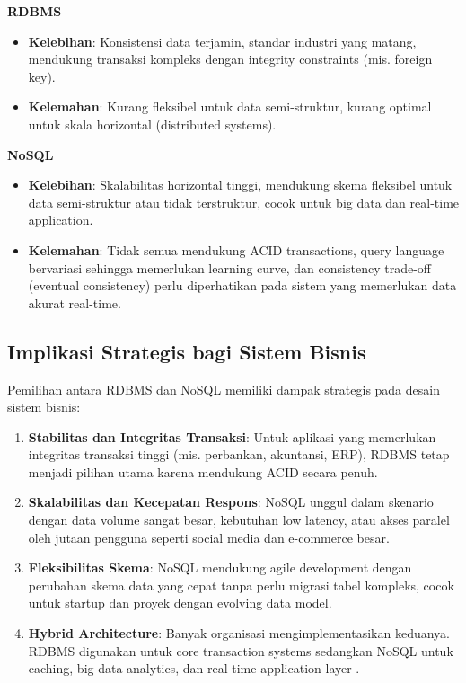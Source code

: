 \textbf{RDBMS}
\begin{itemize}
	\item \textbf{Kelebihan}: Konsistensi data terjamin, standar industri yang matang, mendukung transaksi kompleks dengan integrity constraints (mis. foreign key).
	\item \textbf{Kelemahan}: Kurang fleksibel untuk data semi-struktur, kurang optimal untuk skala horizontal (distributed systems).
\end{itemize}

\textbf{NoSQL}
\begin{itemize}
	\item \textbf{Kelebihan}: Skalabilitas horizontal tinggi, mendukung skema fleksibel untuk data semi-struktur atau tidak terstruktur, cocok untuk big data dan real-time application.
	\item \textbf{Kelemahan}: Tidak semua mendukung ACID transactions, query language bervariasi sehingga memerlukan learning curve, dan consistency trade-off (eventual consistency) perlu diperhatikan pada sistem yang memerlukan data akurat real-time.
\end{itemize}

\subsection{Implikasi Strategis bagi Sistem Bisnis}

Pemilihan antara RDBMS dan NoSQL memiliki dampak strategis pada desain sistem bisnis:

\begin{enumerate}
	\item \textbf{Stabilitas dan Integritas Transaksi}: Untuk aplikasi yang memerlukan integritas transaksi tinggi (mis. perbankan, akuntansi, ERP), RDBMS tetap menjadi pilihan utama karena mendukung ACID secara penuh.
	\item \textbf{Skalabilitas dan Kecepatan Respons}: NoSQL unggul dalam skenario dengan data volume sangat besar, kebutuhan low latency, atau akses paralel oleh jutaan pengguna seperti social media dan e-commerce besar.
	\item \textbf{Fleksibilitas Skema}: NoSQL mendukung agile development dengan perubahan skema data yang cepat tanpa perlu migrasi tabel kompleks, cocok untuk startup dan proyek dengan evolving data model.
	\item \textbf{Hybrid Architecture}: Banyak organisasi mengimplementasikan keduanya. RDBMS digunakan untuk core transaction systems sedangkan NoSQL untuk caching, big data analytics, dan real-time application layer \cite{gandomi2015, moniruzzaman2013nosql}.
\end{enumerate}

